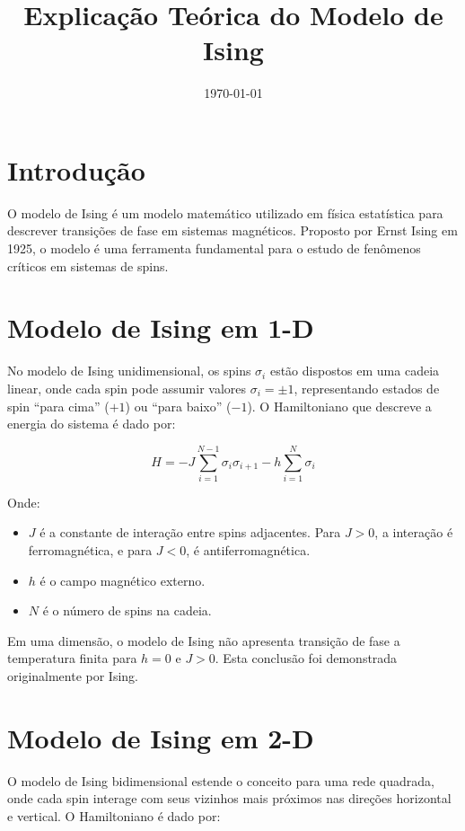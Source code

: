 \documentclass{article}
\title{Explicação Teórica do Modelo de Ising}
\author{}
\date{\today}
\begin{document}
\maketitle

\section{Introdução}

O modelo de Ising é um modelo matemático utilizado em física estatística para descrever transições de fase em sistemas magnéticos. Proposto por Ernst Ising em 1925, o modelo é uma ferramenta fundamental para o estudo de fenômenos críticos em sistemas de spins.

\section{Modelo de Ising em 1-D}

No modelo de Ising unidimensional, os spins $\sigma_i$ estão dispostos em uma cadeia linear, onde cada spin pode assumir valores $\sigma_i = \pm 1$, representando estados de spin ``para cima'' ($+1$) ou ``para baixo'' ($-1$). O Hamiltoniano que descreve a energia do sistema é dado por:

\begin{equation}
H = -J \sum_{i=1}^{N-1} \sigma_i \sigma_{i+1} - h \sum_{i=1}^{N} \sigma_i
\end{equation}

Onde:
\begin{itemize}
    \item $J$ é a constante de interação entre spins adjacentes. Para $J > 0$, a interação é ferromagnética, e para $J < 0$, é antiferromagnética.
    \item $h$ é o campo magnético externo.
    \item $N$ é o número de spins na cadeia.
\end{itemize}

Em uma dimensão, o modelo de Ising não apresenta transição de fase a temperatura finita para $h = 0$ e $J > 0$. Esta conclusão foi demonstrada originalmente por Ising.

\section{Modelo de Ising em 2-D}

O modelo de Ising bidimensional estende o conceito para uma rede quadrada, onde cada spin interage com seus vizinhos mais próximos nas direções horizontal e vertical. O Hamiltoniano é dado por:
\end{document}
